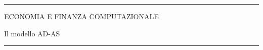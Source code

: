 \documentclass[12pt,aspectratio=169]{beamer}
\begin{document}
\begin{frame}
\unitlength 5mm

\begin{center}

\rule{\textwidth}{2pt}

\vskip3mm
ECONOMIA E FINANZA COMPUTAZIONALE

Il modello AD-AS

\rule{\textwidth}{2pt}

\end{center}

\end{frame}


\end{document}
